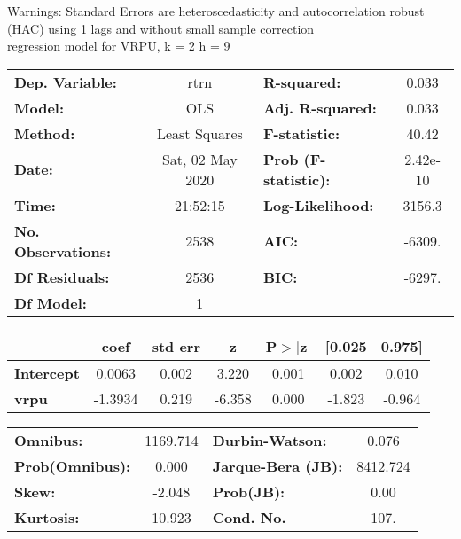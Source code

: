 Warnings: \newline
 [1] Standard Errors are heteroscedasticity and autocorrelation robust (HAC) using 1 lags and without small sample correction\\ 

regression model for VRPU, k = 2 h = 9\begin{center}
\begin{tabular}{lclc}
\toprule
\textbf{Dep. Variable:}    &       rtrn       & \textbf{  R-squared:         } &     0.033   \\
\textbf{Model:}            &       OLS        & \textbf{  Adj. R-squared:    } &     0.033   \\
\textbf{Method:}           &  Least Squares   & \textbf{  F-statistic:       } &     40.42   \\
\textbf{Date:}             & Sat, 02 May 2020 & \textbf{  Prob (F-statistic):} &  2.42e-10   \\
\textbf{Time:}             &     21:52:15     & \textbf{  Log-Likelihood:    } &    3156.3   \\
\textbf{No. Observations:} &        2538      & \textbf{  AIC:               } &    -6309.   \\
\textbf{Df Residuals:}     &        2536      & \textbf{  BIC:               } &    -6297.   \\
\textbf{Df Model:}         &           1      & \textbf{                     } &             \\
\bottomrule
\end{tabular}
\begin{tabular}{lcccccc}
                   & \textbf{coef} & \textbf{std err} & \textbf{z} & \textbf{P$> |$z$|$} & \textbf{[0.025} & \textbf{0.975]}  \\
\midrule
\textbf{Intercept} &       0.0063  &        0.002     &     3.220  &         0.001        &        0.002    &        0.010     \\
\textbf{vrpu}      &      -1.3934  &        0.219     &    -6.358  &         0.000        &       -1.823    &       -0.964     \\
\bottomrule
\end{tabular}
\begin{tabular}{lclc}
\textbf{Omnibus:}       & 1169.714 & \textbf{  Durbin-Watson:     } &    0.076  \\
\textbf{Prob(Omnibus):} &   0.000  & \textbf{  Jarque-Bera (JB):  } & 8412.724  \\
\textbf{Skew:}          &  -2.048  & \textbf{  Prob(JB):          } &     0.00  \\
\textbf{Kurtosis:}      &  10.923  & \textbf{  Cond. No.          } &     107.  \\
\bottomrule
\end{tabular}
\end{center}

